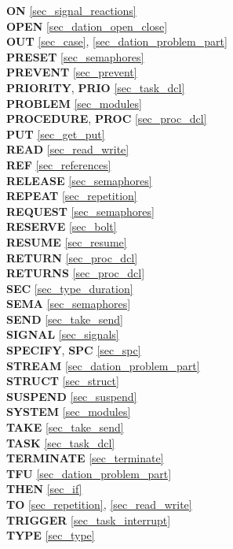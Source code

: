 {{\bf ON} \ref{sec_signal_reactions}\\
{\bf OPEN} \ref{sec_dation_open_close}\\
{\bf OUT} \ref{sec_case}, \ref{sec_dation_problem_part}\\
 
{\bf PRESET} \ref{sec_semaphores}\\
{\bf PREVENT} \ref{sec_prevent}\\
{\bf PRIORITY}, {\bf PRIO} \ref{sec_task_dcl}\\
{\bf PROBLEM} \ref{sec_modules}\\
{\bf PROCEDURE}, {\bf PROC} \ref{sec_proc_dcl}\\
{\bf PUT} \ref{sec_get_put}\\

{\bf READ} \ref{sec_read_write}\\
{\bf REF} \ref{sec_references}\\
{\bf RELEASE} \ref{sec_semaphores}\\
{\bf REPEAT} \ref{sec_repetition}\\
{\bf REQUEST} \ref{sec_semaphores}\\
{\bf RESERVE} \ref{sec_bolt}\\
{\bf RESUME} \ref{sec_resume}\\
{\bf RETURN} \ref{sec_proc_dcl}\\
{\bf RETURNS} \ref{sec_proc_dcl}\\
 
{\bf SEC} \ref{sec_type_duration}\\
{\bf SEMA} \ref{sec_semaphores}\\
{\bf SEND} \ref{sec_take_send}\\
{\bf SIGNAL} \ref{sec_signals}\\
{\bf SPECIFY}, {\bf SPC} \ref{sec_spc}\\
{\bf STREAM} \ref{sec_dation_problem_part}\\
{\bf STRUCT} \ref{sec_struct}\\
{\bf SUSPEND} \ref{sec_suspend}\\
{\bf SYSTEM} \ref{sec_modules}\\
 
{\bf TAKE} \ref{sec_take_send}\\
{\bf TASK} \ref{sec_task_dcl}\\
{\bf TERMINATE} \ref{sec_terminate}\\
{\bf TFU} \ref{sec_dation_problem_part}\\
{\bf THEN} \ref{sec_if}\\
{\bf TO} \ref{sec_repetition}, \ref{sec_read_write}\\
{\bf TRIGGER} \ref{sec_task_interrupt}\\
{\bf TYPE} \ref{sec_type}\\
 
}

